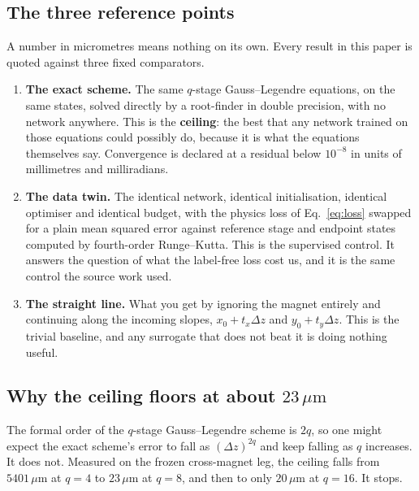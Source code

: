 \documentclass[11pt,a4paper]{article}
\newcommand{\um}{\ensuremath{\,\mu\mathrm{m}}}
\begin{document}
\subsection{The three reference points}
\label{sec:refs}

A number in micrometres means nothing on its own. Every result in this paper is
quoted against three fixed comparators.

\begin{enumerate}
  \item \textbf{The exact scheme.} The same $q$-stage Gauss--Legendre equations,
  on the same states, solved directly by a root-finder in double precision, with
  no network anywhere. This is the \textbf{ceiling}: the best that any network
  trained on those equations could possibly do, because it is what the equations
  themselves say. Convergence is declared at a residual below $10^{-8}$ in units
  of millimetres and milliradians.

  \item \textbf{The data twin.} The identical network, identical initialisation,
  identical optimiser and identical budget, with the physics loss of
  Eq.~\eqref{eq:loss} swapped for a plain mean squared error against reference
  stage and endpoint states computed by fourth-order Runge--Kutta. This is the
  supervised control. It answers the question of what the label-free loss cost
  us, and it is the same control the source work used.

  \item \textbf{The straight line.} What you get by ignoring the magnet entirely
  and continuing along the incoming slopes, $x_0 + t_x \Delta z$ and
  $y_0 + t_y \Delta z$. This is the trivial baseline, and any surrogate that
  does not beat it is doing nothing useful.
\end{enumerate}

\subsection{Why the ceiling floors at about \texorpdfstring{$23\um$}{23 micrometres}}
\label{sec:floor}

The formal order of the $q$-stage Gauss--Legendre scheme is $2q$, so one might
expect the exact scheme's error to fall as $(\Delta z)^{2q}$ and keep falling as
$q$ increases. It does not. Measured on the frozen cross-magnet leg, the ceiling
falls from $5401\um$ at $q = 4$ to $23\um$ at $q = 8$, and then to only $20\um$
at $q = 16$. It stops.
\end{document}
